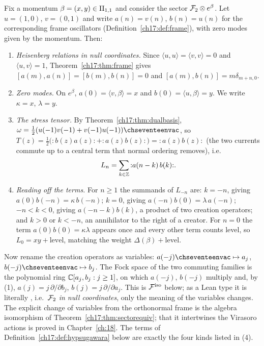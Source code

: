 Fix a momentum $\beta=(x,y)\in{\mathrm{II}_{1,1}}$ and consider the sector $\mathcal{F}_2\otimes e^\beta$.  Let $u=(1,0)$, $v=(0,1)$ and
write $a(n)=v(n)$, $b(n)=u(n)$ for the corresponding frame oscillators (Definition~\ref{ch17:def:frame}), with zero
modes given by the momentum.  Then:
\begin{enumerate}[label=(\arabic*)]
\item \emph{Heisenberg relations in null coordinates.}  Since $\langle u,u\rangle=\langle v,v\rangle=0$ and $\langle u,v\rangle=1$,
  Theorem~\ref{ch17:thm:frame} gives $[a(m),a(n)]=[b(m),b(n)]=0$ and $[a(m),b(n)]=m\delta_{m+n,0}$.
\item \emph{Zero modes.}  On $e^\beta$, $a(0)=\langle v,\beta\rangle=x$ and $b(0)=\langle u,\beta\rangle=y$.  We write
  $\kappa=x$, $\lambda=y$.
\item \emph{The stress tensor.}  By Theorem~\ref{ch17:thm:dualbasis}, $\omega=\frac12(u(-1)v(-1)+v(-1)u(-1))\chseventeenvac$, so
  $T(z)=\frac12\bigl({:}b(z)a(z){:}+{:}a(z)b(z){:}\bigr)={:}a(z)b(z){:}$ (the two currents commute up to a central term
  that normal ordering removes), i.e.
  \begin{equation*}
    L_n=\sum_{k\in{\mathbb{Z}}}{:}a(n-k)\,b(k){:} .
  \end{equation*}
\item \emph{Reading off the terms.}  For $n\ge1$ the summands of $L_{-n}$ are: $k=-n$, giving $a(0)b(-n)=\kappa\,b(-n)$;
  $k=0$, giving $a(-n)b(0)=\lambda\,a(-n)$; $-n<k<0$, giving $a(-n-k)b(k)$, a product of two creation operators;
  and $k>0$ or $k<-n$, an annihilator to the right of a creator.  For $n=0$ the term $a(0)b(0)=\kappa\lambda$ appears
  once and every other term counts level, so $L_0=xy+\text{level}$, matching the weight
  $\Delta(\beta)+\text{level}$.
\end{enumerate}
Now rename the creation operators as variables: $a(-j)\chseventeenvac\mapsto a_j$, $b(-j)\chseventeenvac\mapsto b_j$.  The Fock space of
the two commuting families is the polynomial ring ${\mathbb{C}}[a_j,b_j:j\ge1]$, on which $a(-j)$, $b(-j)$ multiply and, by (1),
$a(j)=j\,\partial/\partial b_j$, $b(j)=j\,\partial/\partial a_j$.  This is $\mathcal{F}^{\mathrm{iso}}$ below; as a Lean type it is literally
, i.e.\ $\mathcal{F}_2$ \emph{in null coordinates}, only the meaning of the variables changes.  The
explicit change of variables from the orthonormal frame is the algebra isomorphism of Theorem~\ref{ch17:thm:sectorequiv};
that it intertwines the Virasoro actions is proved in Chapter~\ref{ch:18}.  The terms of Definition~\ref{ch17:def:hypsugawara}
below are exactly the four kinds listed in (4).

